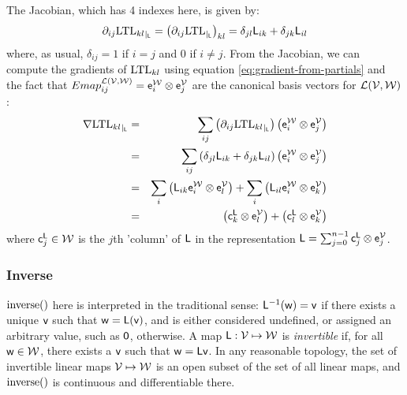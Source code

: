 The Jacobian, which has 4 indexes here, is given by:
\begin{equation}
{\partial}_{ij}{\mathrm{LTL}_{kl}}_{\mid_{\mathsf{L}}}
 =
\left( {\partial}_{ij}{\mathrm{LTL}}_{\mid_{\mathsf{L}}} \right)_{kl}
=
\delta_{jl} \mathsf{L}_{ik}
+
\delta_{jk} \mathsf{L}_{il}
\end{equation}
where, as usual, $\delta_{ij} = 1$ if $i=j$ and  $0$ if $i \neq j$.
From the Jacobian, we can compute the gradients of $\mathrm{LTL}_{kl}$
using equation \ref{eq:gradient-from-partials}
and the fact that
$Emap_{ij}^{\mathcal{L}(\mathcal{V},\mathcal{W})}  = \mathsf{e}_i^{\mathcal{W}} \otimes \mathsf{e}_j^{\mathcal{V}}$
are the canonical basis vectors for $\mathcal{L}(\mathcal{V},\mathcal{W})$:
\begin{eqnarray}
{\mathbf \nabla}{\mathrm{LTL}_{kl}}_{\mid_{\mathsf{L}}}
& = &
\sum_{ij}
\left( {\partial}_{ij}{\mathrm{LTL}_{kl}}_{\mid_{\mathsf{L}}} \right)
\left( \mathsf{e}_i^{\mathcal{W}} \otimes \mathsf{e}_j^{\mathcal{V}} \right)
\\
& = &
\sum_{ij}
\left( \delta_{jl} \mathsf{L}_{ik} + \delta_{jk} \mathsf{L}_{il} \right)
\left( \mathsf{e}_i^{\mathcal{W}} \otimes \mathsf{e}_j^{\mathcal{V}} \right)
\nonumber
\\
& = &
\sum_{i}
\left(
\mathsf{L}_{ik}  \mathsf{e}_i^{\mathcal{W}} \otimes \mathsf{e}_l^{\mathcal{V}}
\right)
+
\sum_{i}
\left(
\mathsf{L}_{il}  \mathsf{e}_i^{\mathcal{W}} \otimes \mathsf{e}_k^{\mathcal{V}}
\right)
\nonumber
\\
& = &
\left(
\mathsf{c}_k^{\mathsf{L}} \otimes \mathsf{e}_l^{\mathcal{V}}
\right)
+
\left(
\mathsf{c}_l^{\mathsf{L}} \otimes \mathsf{e}_k^{\mathcal{V}}
\right)
\nonumber
\end{eqnarray}
where $\mathsf{c}_j^{\mathsf{L}} \in \mathcal{W}$ is the $j$th 'column' of $\mathsf{L}$
in the representation
$\mathsf{L} = \sum_{j=0}^{n-1} \mathsf{c}_j^{\mathsf{L}} \otimes \mathsf{e}_j^{\mathcal{V}}$.


\subsubsection{Inverse}
\label{sec:Inverse}

$\mathrm{inverse}()$ here is interpreted in the traditional sense:
$\mathsf{L}^{-1}(\mathsf{w}) = \mathsf{v}$ if there exists a unique $\mathsf{v}$ such that $\mathsf{w} = \mathsf{L}(\mathsf{v})$,
and is either considered undefined, or assigned an arbitrary
value, such as ${\mathsf 0}$, otherwise.
A map $\mathsf{L} : \mathcal{V} \mapsto \mathcal{W}$ is {\it invertible}
if, for all $\mathsf{w} \in \mathcal{W}$, there exists a $\mathsf{v}$ such that
$\mathsf{w} = \mathsf{L} \mathsf{v}$.
In any reasonable topology,
the set of invertible linear maps $\mathcal{V} \mapsto \mathcal{W}$
is an open subset of the set of all linear maps,
and $\mathrm{inverse}()$ is continuous and differentiable there.

